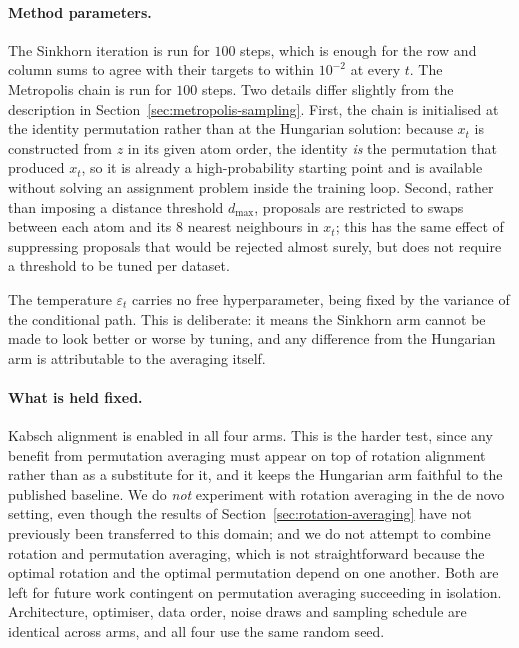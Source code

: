 \paragraph{Method parameters.}
The Sinkhorn iteration is run for $100$ steps, which is enough for the row and column sums to
agree with their targets to within $10^{-2}$ at every $t$. The Metropolis chain is run for $100$
steps. Two details differ slightly from the description in Section~\ref{sec:metropolis-sampling}.
First, the chain is initialised at the identity permutation rather than at the Hungarian solution:
because $x_t$ is constructed from $z$ in its given atom order, the identity \emph{is} the
permutation that produced $x_t$, so it is already a high-probability starting point and is
available without solving an assignment problem inside the training loop. Second, rather than
imposing a distance threshold $d_{\max}$, proposals are restricted to swaps between each atom and
its $8$ nearest neighbours in $x_t$; this has the same effect of suppressing proposals that would
be rejected almost surely, but does not require a threshold to be tuned per dataset.

The temperature $\varepsilon_t$ carries no free hyperparameter, being fixed by the variance of the
conditional path. This is deliberate: it means the Sinkhorn arm cannot be made to look better or
worse by tuning, and any difference from the Hungarian arm is attributable to the averaging itself.

\paragraph{What is held fixed.}
Kabsch alignment is enabled in all four arms. This is the harder test, since any benefit from
permutation averaging must appear on top of rotation alignment rather than as a substitute for it,
and it keeps the Hungarian arm faithful to the published baseline. We do \emph{not} experiment with
rotation averaging in the de novo setting, even though the results of
Section~\ref{sec:rotation-averaging} have not previously been transferred to this domain; and we do
not attempt to combine rotation and permutation averaging, which is not straightforward because the
optimal rotation and the optimal permutation depend on one another. Both are left for future work
contingent on permutation averaging succeeding in isolation. Architecture, optimiser, data order,
noise draws and sampling schedule are identical across arms, and all four use the same random seed.


